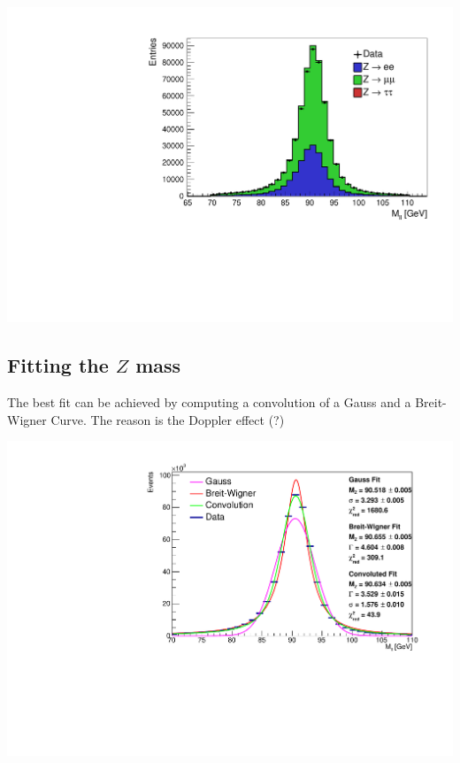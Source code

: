 \documentclass[12pt, a4paper, bibliography=totoc]{scrartcl}
\begin{document}
\begin{multicols}{2}
\begin{center}
	\includegraphics[width=\linewidth]{fig/vergleich_data_mc_final.pdf}
	\label{fig:data_mc}
\end{center}

\subsection{Fitting the $Z$ mass}
The best fit can be achieved by computing a convolution of a Gauss and a Breit-Wigner Curve.
The reason is the Doppler effect (?)

\begin{center}
	\includegraphics[width=\linewidth]{fig/invar_z_mass.pdf}
	\label{fig:fit}
\end{center}



\end{multicols}
\end{document}
